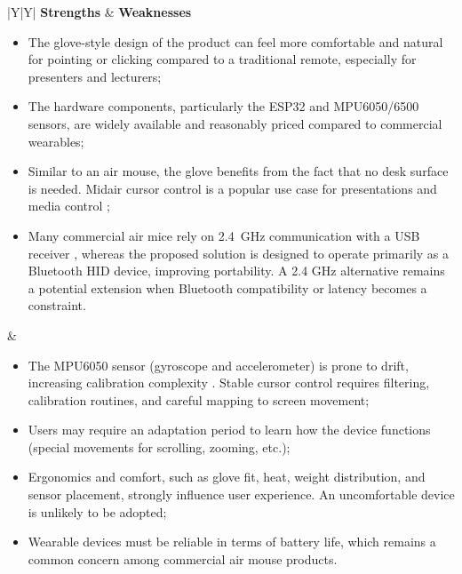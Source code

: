 \label{appendix:comparative_table}

\begin{table}[H]
\caption{SWOT Analysis of the Proposed Air Mouse Glove}
\label{tbl:swot}
\begin{tabularx}{\textwidth}{|Y|Y|}
\hline
\textbf{Strengths} & \textbf{Weaknesses} \\
\hline
\begin{itemize}[leftmargin=*, labelsep=0.4em]
    \item The glove-style design of the product can feel more comfortable and natural for pointing or clicking compared to a traditional remote, especially for presenters and lecturers;
    \item The hardware components, particularly the ESP32 and MPU6050/6500 sensors, are widely available and reasonably priced compared to commercial wearables;
    \item Similar to an air mouse, the glove benefits from the fact that no desk surface is needed. Midair cursor control is a popular use case for presentations and media control \cite{youtube_airmouse_demo,cornell_airmouse_project};
    \item Many commercial air mice rely on 2.4~GHz communication with a USB receiver \cite{airmouse_y10l,amazon_imouse_p30}, whereas the proposed solution is designed to operate primarily as a Bluetooth HID device, improving portability. A 2.4 GHz alternative remains a potential extension when Bluetooth compatibility or latency becomes a constraint.
\end{itemize}
&
\begin{itemize}[leftmargin=*, labelsep=0.4em]
    \item The MPU6050 sensor (gyroscope and accelerometer) is prone to drift, increasing calibration complexity \cite{gesture_hci_research}. Stable cursor control requires filtering, calibration routines, and careful mapping to screen movement;
    \item Users may require an adaptation period to learn how the device functions (special movements for scrolling, zooming, etc.);
    \item Ergonomics and comfort, such as glove fit, heat, weight distribution, and sensor placement, strongly influence user experience. An uncomfortable device is unlikely to be adopted;
    \item Wearable devices must be reliable in terms of battery life, which remains a common concern among commercial air mouse products.

\end{itemize}
\end{tabularx}
\end{table}
